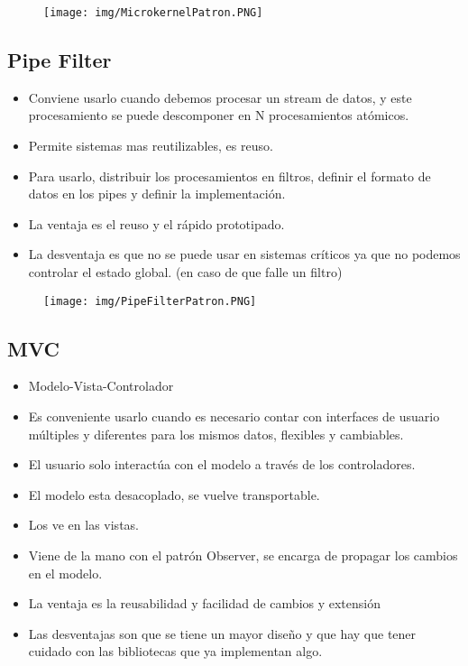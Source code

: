 \begin{figure}[!htb]
    \centering
    \texttt{[image: img/MicrokernelPatron.PNG]}
\end{figure}


\subsection*{Pipe Filter}

\begin{itemize}
\item Conviene usarlo cuando debemos procesar un stream de datos, y este procesamiento se puede descomponer en N procesamientos atómicos.
\item Permite sistemas mas reutilizables, es reuso.
\item Para usarlo, distribuir los procesamientos en filtros, definir el formato de datos en los pipes y definir la implementación.
\item La ventaja es el reuso y el rápido prototipado.
\item La desventaja es que no se puede usar en sistemas críticos ya que no podemos controlar el estado global. (en caso de que falle un filtro)
\end{itemize}

\begin{figure}[!htb]
    \centering
    \texttt{[image: img/PipeFilterPatron.PNG]}
\end{figure}


\subsection*{MVC}

\begin{itemize}
\item Modelo-Vista-Controlador
\item Es conveniente usarlo cuando es necesario contar con interfaces de usuario múltiples y diferentes para los mismos datos, flexibles y cambiables.
\item El usuario solo interactúa con el modelo a través de los controladores.
\item El modelo esta desacoplado, se vuelve transportable.
\item Los ve en las vistas.
\item Viene de la mano con el patrón Observer, se encarga de propagar los cambios en el modelo.
\item La ventaja es la reusabilidad y facilidad de cambios y extensión
\item Las desventajas son que se tiene un mayor diseño y que hay que tener cuidado con las bibliotecas que ya implementan algo.
\end{itemize}

